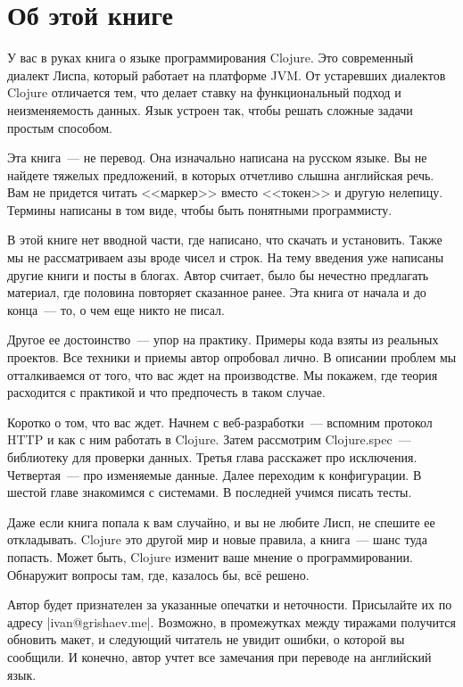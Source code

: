 \chapter*{Об этой книге}

У вас в руках книга о языке программирования Clojure. Это современный диалект
Лиспа, который работает на платформе JVM. От устаревших диалектов Clojure
отличается тем, что делает ставку на функциональный подход и неизменяемость
данных. Язык устроен так, чтобы решать сложные задачи простым способом.

Эта книга~--- не перевод. Она изначально написана на русском языке. Вы не
найдете тяжелых предложений, в которых отчетливо слышна английская речь. Вам не
придется читать <<маркер>> вместо <<токен>> и другую нелепицу. Термины написаны
в том виде, чтобы быть понятными программисту.

В этой книге нет вводной части, где написано, что скачать и установить. Также мы
не рассматриваем азы вроде чисел и строк. На тему введения уже написаны другие
книги и посты в блогах. Автор считает, было бы нечестно предлагать материал, где
половина повторяет сказанное ранее. Эта книга от начала и до конца~--- то, о чем
еще никто не писал.

Другое ее достоинство~--- упор на практику. Примеры кода взяты из реальных
проектов. Все техники и приемы автор опробовал лично. В описании проблем мы
отталкиваемся от того, что вас ждет на производстве. Мы покажем, где теория
расходится с практикой и что предпочесть в таком случае.

Коротко о том, что вас ждет. Начнем с веб-разработки~--- вспомним протокол HTTP
и как с ним работать в Clojure. Затем рассмотрим Clojure.spec~--- библиотеку для
проверки данных. Третья глава расскажет про исключения. Четвертая~--- про
изменяемые данные. Далее переходим к конфигурации. В шестой главе знакомимся с
системами. В последней учимся писать тесты.

Даже если книга попала к вам случайно, и вы не любите Лисп, не спешите ее
откладывать. Clojure это другой мир и новые правила, а книга~--- шанс туда
попасть. Может быть, Clojure изменит ваше мнение о программировании. Обнаружит
вопросы там, где, казалось бы, вс\"{е} решено.

Автор будет признателен за указанные опечатки и неточности. Присылайте их по
адресу \spverb|ivan@grishaev.me|. Возможно, в промежутках между тиражами
получится обновить макет, и следующий читатель не увидит ошибки, о которой вы
сообщили. И конечно, автор учтет все замечания при переводе на английский язык.


